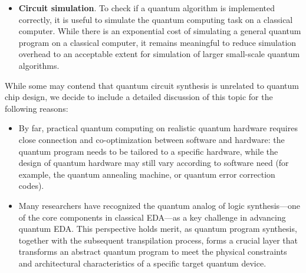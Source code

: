 \documentclass[a4paper,onecolumn,11pt,unpublished]{quantumarticle}
\begin{document}
\begin{itemize}
\begin{itemize}
        \item \textbf{ISA rebase}. This converts the quantum gates within an optimized quantum circuit to the natively implemented gate set. For instance, two-qubit gates (or two-qubit subcircuits) are decomposed into subcircuits consisting of native CZ/iSWAP gates and arbitrary single-qubit gates. Arbitrary single-qubit gates are further represented as a sequence of continuous phase-shifted virtual-$ Z $ operations and fixed $R_x$ rotations.
    \end{itemize}
    \item \textbf{Circuit simulation}. To check if a quantum algorithm is implemented correctly, it is useful to simulate the quantum computing task on a classical computer. While there is an exponential cost of simulating a general quantum program on a classical computer, it remains meaningful to reduce simulation overhead to an acceptable extent for simulation of larger small-scale quantum algorithms.
\end{itemize}

While some may contend that quantum circuit synthesis is unrelated to quantum chip design, we decide to include a detailed discussion of this topic for the following reasons:

\begin{itemize}
\item By far, practical quantum computing on realistic quantum hardware requires close connection and co-optimization between software and hardware: the quantum program needs to be tailored to a specific hardware, while the design of quantum hardware may still vary according to software need (for example, the quantum annealing machine, or quantum error correction codes).
\item Many researchers have recognized the quantum analog of logic synthesis---one of the core components in classical EDA---as a key challenge in advancing quantum EDA. This perspective holds merit, as quantum program synthesis, together with the subsequent transpilation process, forms a crucial layer that transforms an abstract quantum program to meet the physical constraints and architectural characteristics of a specific target quantum device.
\end{itemize}
\end{document}
